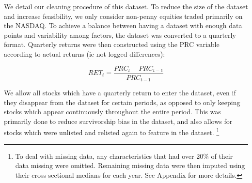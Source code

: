 \documentclass{article}
\begin{document}


We detail our cleaning procedure of this dataset. To reduce the size of the dataset and increase feasibility, we only consider non-penny equities traded primarily on the NASDAQ. To achieve a balance between having a dataset with enough data points and variability among factors, the dataset was converted to a quarterly format. Quarterly returns were then constructed using the PRC variable according to actual returns (ie not logged differences):

\begin{equation}
RET_t = \frac{PRC_t - PRC_{t-1}}{PRC_{t-1}}
\end{equation}

We allow all stocks which have a quarterly return to enter the dataset, even if they disappear from the dataset for certain periods, as opposed to only keeping stocks which appear continuously throughout the entire period. This was primarily done to reduce survivorship bias in the dataset, and also allows for stocks which were unlisted and relisted again to feature in the dataset. \footnote{To deal with missing data, any characteristics that had over 20\% of their data missing were omitted. Remaining missing data were then imputed using their cross sectional medians for each year. See Appendix for more details.}


\end{document}
